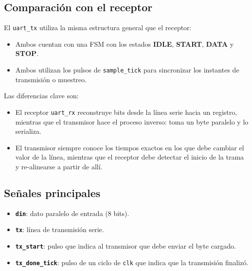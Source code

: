 \subsection{Comparación con el receptor}
El \texttt{uart\_tx} utiliza la misma estructura general que el receptor:
\begin{itemize}
    \item Ambos cuentan con una FSM con los estados \textbf{IDLE}, \textbf{START}, \textbf{DATA} y \textbf{STOP}.
    \item Ambos utilizan los pulsos de \texttt{sample\_tick} para sincronizar los instantes de transmisión o muestreo.
\end{itemize}

Las diferencias clave son:
\begin{itemize}
    \item El receptor \texttt{uart\_rx} reconstruye bits desde la línea serie hacia un registro, mientras que el transmisor hace el proceso inverso: toma un byte paralelo y lo serializa.
    \item El transmisor siempre conoce los tiempos exactos en los que debe cambiar el valor de la línea, mientras que el receptor debe detectar el inicio de la trama y re-alinearse a partir de allí.
\end{itemize}

\subsection{Señales principales}
\begin{itemize}
    \item \textbf{\texttt{din}}: dato paralelo de entrada (8 bits).
    \item \textbf{\texttt{tx}}: línea de transmisión serie.
    \item \textbf{\texttt{tx\_start}}: pulso que indica al transmisor que debe enviar el byte cargado.
    \item \textbf{\texttt{tx\_done\_tick}}: pulso de un ciclo de \texttt{clk} que indica que la transmisión finalizó.
\end{itemize}
